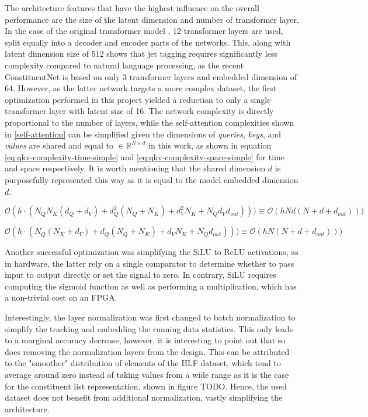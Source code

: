 The architecture features that have the highest influence on the overall performance are the size of the latent dimension and number of transformer layer. In the case of the original transformer model \cite{44-vaswani2017attention}, 12 transformer layers are used, split equally into a decoder and encoder parts of the networks. This, along with latent dimension size of 512 shows that jet tagging requires significantly less complexity compared to natural language processing, as the recent ConstituentNet \cite{3-yuan2021constituentnet:} is based on only 3 transformer layers and embedded dimension of 64. However, as the latter network targets a more complex dataset, the first optimization performed in this project yielded a reduction to only a single transformer layer with latent size of 16. The network complexity is directly proportional to the number of layers, while the self-attention complexities shown in \cref{self-attention} can be simplified given the dimensions of \textit{queries}, \textit{keys}, and \textit{values} are shared and equal to \(\in \mathbb{R}^{N \times d}\) in this work, 
as shown in equation \ref{eq:qkv-complexity-time-simple} and \ref{eq:qkv-complexity-space-simple} for time and space respectively. It is worth mentioning that the shared dimension \(d\) is purposefully represented this way as it is equal to the model embedded dimension \(d\).

\begin{equation}\label{eq:qkv-complexity-time-simple}
  \mathcal{O}(h \cdot (N_Q N_K (d_Q + d_V) + d_Q^2 (N_Q + N_K) + d_V^2 N_K + N_Q d_V d_{out}) )) \equiv
  \mathcal{O}(h N d (N + d + d_{out}) ))
\end{equation}

\begin{equation}\label{eq:qkv-complexity-space-simple}
  \mathcal{O}(h \cdot (N_Q (N_K + d_V) + d_Q (N_Q + N_K) + d_V N_K + N_Q d_{out}) )) \equiv
  \mathcal{O}(h N (N + d + d_{out}) ))
\end{equation}

Another successful optimization was simplifying the SiLU to ReLU activations, as in hardware, the latter rely on a single comparator to determine whether to pass input to output directly or set the signal to zero. In contrary, SiLU requires computing the sigmoid function as well as performing a multiplication, which has a non-trivial cost on an FPGA.

Interestingly, the layer normalization was first changed to batch normalization to simplify the tracking and embedding the running data statistics. This only leads to a marginal accuracy decrease, however, it is interesting to point out that so does removing the normalization layers from the design. This can be attributed to the "smoother" distribution of elements of the HLF dataset, which tend to average around zero instead of taking values from a wide range as it is the case for the constituent list representation, shown in figure TODO. Hence, the used dataset does not benefit from additional normalization, vastly simplifying the architecture.

